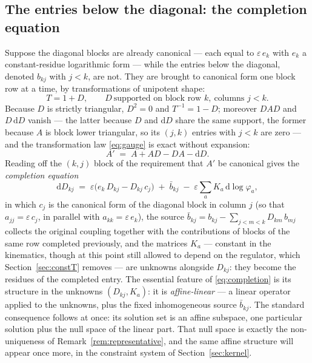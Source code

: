 \documentclass[11pt]{article}
\newcommand{\eps}{\varepsilon}
\newcommand{\dd}{\mathrm{d}}
\begin{document}
\subsection{The entries below the diagonal: the completion equation}
\label{sec:completion}

Suppose the diagonal blocks are already canonical --- each equal to
$\eps\,e_k$ with $e_k$ a constant-residue logarithmic form ---
while the entries below the diagonal, denoted $b_{kj}$ with $j<k$,
are not.  They are brought to canonical form one block row at a
time, by transformations of unipotent shape:
\begin{equation}
  T = 1 + D, \qquad
  D\ \text{supported on block row } k,\ \text{columns } j<k .
\end{equation}
Because $D$ is strictly triangular, $D^2 = 0$ and $T^{-1} = 1 - D$;
moreover $D A D$ and $D\,\dd D$ vanish --- the latter because $D$
and $\dd D$ share the same support, the former because $A$ is block
lower triangular, so its $(j,k)$ entries with $j < k$ are zero ---
and the transformation law \eqref{eq:gauge} is exact without
expansion:
\begin{equation}
  A' \;=\; A + A D - D A - \dd D .
\end{equation}
Reading off the $(k,j)$ block of the requirement that $A'$ be
canonical gives the \emph{completion equation}
\begin{equation}
  \dd D_{kj}
  \;=\; \eps\big( e_k\, D_{kj} - D_{kj}\, c_j \big)
  \;+\; \bar b_{kj}
  \;-\; \eps \sum_a K_a\, \dd\log\varphi_a ,
  \label{eq:completion}
\end{equation}
in which $c_j$ is the canonical form of the diagonal block in
column $j$ (so that $a_{jj} = \eps\,c_j$, in parallel with
$a_{kk} = \eps\,e_k$), the source
$\bar b_{kj} = b_{kj} - \sum_{j<m<k} D_{km}\, b_{mj}$ collects the
original coupling together with the contributions of blocks of the
same row completed previously, and the matrices $K_a$ --- constant in
the kinematics, though at this point still allowed to depend on the
regulator, which Section~\ref{sec:constT} removes --- are unknowns
alongside $D_{kj}$: they become the residues of the completed entry.
The essential feature of \eqref{eq:completion} is its structure in
the unknowns $(D_{kj}, K_a)$: it is \emph{affine-linear} --- a linear
operator applied to the unknowns, plus the fixed inhomogeneous source
$\bar b_{kj}$.  The standard consequence follows at once: its
solution set is an affine subspace, one particular solution plus the
null space of the linear part.  That null space is exactly the
non-uniqueness of Remark~\ref{rem:representative}, and the same
affine structure will appear once more, in the constraint system of
Section~\ref{sec:kernel}.
\end{document}
